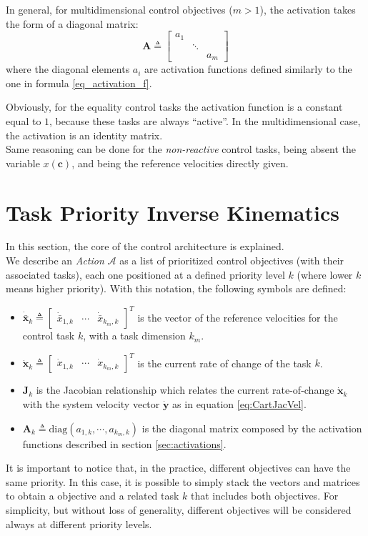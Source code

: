 In general, for multidimensional control objectives ($m > 1$), the activation takes the form of a diagonal matrix:
\begin{equation}
\boldsymbol{A} \triangleq
	\begin{bmatrix}
	a_1 & & \\
	& \ddots & \\
	& & a_m	 
	\end{bmatrix}
\end{equation}
where the diagonal elements $a_i$ are activation functions defined similarly to the one in formula \eqref{eq_activation_f}.

Obviously, for the equality control tasks the activation function is a constant equal to $1$, because these tasks are always \enquote{active}. In the multidimensional case, the activation is an identity matrix.\\
Same reasoning can be done for the \textit{non-reactive} control tasks, being absent the variable $x(\boldsymbol{c})$, and being the reference velocities directly given.


\section{Task Priority Inverse Kinematics}
\label{sec:tpik}
In this section, the core of the control architecture is explained.\\
We describe an \textit{Action} $\mathcal{A}$ as a list of prioritized control objectives (with their associated tasks), each one positioned at a defined priority level $k$ (where lower $k$ means higher priority). With this notation, the following symbols are defined:
\begin{itemize}
	\item $\dot{\bar{\boldsymbol{x}}}_k \triangleq \begin{bmatrix}\dot{\bar{x}}_{1,k} & \cdots & \dot{\bar{x}}_{k_m,k}\end{bmatrix}^T$ is the vector of the reference velocities for the control task $k$, with a task dimension $k_m$.
	\item $\dot{\boldsymbol{x}}_k \triangleq \begin{bmatrix}\dot{x}_{1,k} & \cdots & \dot{x}_{k_m,k}\end{bmatrix}^T$ is the current rate of change of the task $k$.
	\item $\boldsymbol{J}_k$ is the Jacobian relationship which relates the current rate-of-change $\dot{\boldsymbol{x}}_k$ with the system velocity vector $\dot{\boldsymbol{y}}$ as in equation \eqref{eq:CartJacVel}.
	\item $\boldsymbol{A}_k \triangleq \textrm{diag}(a_{1,k},  \cdots,  a_{k_m,k})$ is the diagonal matrix composed by the activation functions described in section \ref{sec:activations}.
\end{itemize}
It is important to notice that, in the practice, different objectives can have the same priority. In this case, it is possible to simply stack the vectors and matrices to obtain a objective and a related task $k$ that includes both objectives. For simplicity, but without loss of generality, different objectives will be considered always at different priority levels.\\

